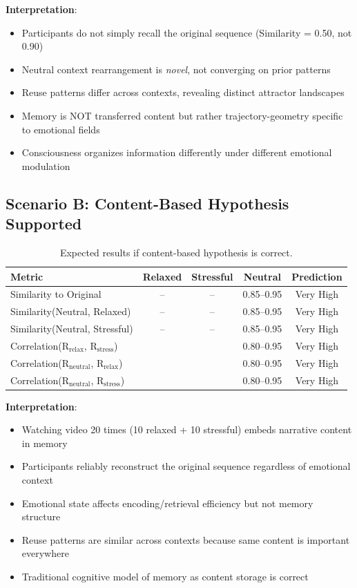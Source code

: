 \documentclass[12pt,a4paper]{article}
\theoremstyle{definition}
\begin{document}
\textbf{Interpretation}:
\begin{itemize}
  \item Participants do not simply recall the original sequence (Similarity = 0.50, not 0.90)
  \item Neutral context rearrangement is \textit{novel}, not converging on prior patterns
  \item Reuse patterns differ across contexts, revealing distinct attractor landscapes
  \item Memory is NOT transferred content but rather trajectory-geometry specific to emotional fields
  \item Consciousness organizes information differently under different emotional modulation
\end{itemize}

\subsection{Scenario B: Content-Based Hypothesis Supported}

\begin{table}[H]
\centering
\begin{tabular}{lcccc}
\toprule
Metric & Relaxed & Stressful & Neutral & Prediction \\
\midrule
Similarity to Original & -- & -- & 0.85--0.95 & Very High \\
Similarity(Neutral, Relaxed) & -- & -- & 0.85--0.95 & Very High \\
Similarity(Neutral, Stressful) & -- & -- & 0.85--0.95 & Very High \\
Correlation(R$_{\text{relax}}$, R$_{\text{stress}}$) & & & 0.80--0.95 & Very High \\
Correlation(R$_{\text{neutral}}$, R$_{\text{relax}}$) & & & 0.80--0.95 & Very High \\
Correlation(R$_{\text{neutral}}$, R$_{\text{stress}}$) & & & 0.80--0.95 & Very High \\
\bottomrule
\end{tabular}
\caption{Expected results if content-based hypothesis is correct.}
\end{table}

\textbf{Interpretation}:
\begin{itemize}
  \item Watching video 20 times (10 relaxed + 10 stressful) embeds narrative content in memory
  \item Participants reliably reconstruct the original sequence regardless of emotional context
  \item Emotional state affects encoding/retrieval efficiency but not memory structure
  \item Reuse patterns are similar across contexts because same content is important everywhere
  \item Traditional cognitive model of memory as content storage is correct
\end{itemize}
\end{document}
